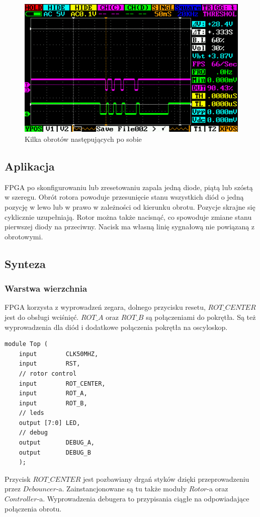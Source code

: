 \documentclass[a4paper,12pt]{article}
\begin{document}
\begin{figure}[htb]
   \centering
   \includegraphics[width=13cm]{grafika/dso/rotor-w-prawo-wiele.png}
   \caption{Kilka obrotów następujących po sobie}
\end{figure}

\subsection{Aplikacja}

FPGA po skonfigurowaniu lub zresetowaniu zapala jedną diode, piątą lub szóstą w szeregu. Obrót rotora powoduje przesunięcie stanu wszystkich diód o jedną pozycję w lewo lub w prawo w zależności od kierunku obrotu. Pozycje skrajne się cyklicznie uzupełniają. Rotor można także nacisnąć, co spowoduje zmiane stanu pierwszej diody na przeciwny. Nacisk ma własną linię sygnałową nie powiązaną z obrotowymi.

\subsection{Synteza}

\subsubsection{Warstwa wierzchnia}

FPGA korzysta z wyprowadzeń zegara, dolnego przycisku resetu, $ROT\_CENTER$ jest do obsługi wciśnięć. $ROT\_A$ oraz $ROT\_B$ są połączeniami do pokrętła. Są też wyprowadzenia dla diód i dodatkowe połączenia pokrętła na oscyloskop.
\begin{lstlisting}[label=Rs232Tx,caption=Rs232Tx.v,firstnumber=14]
module Top (
    input        CLK50MHZ,
    input        RST,
    // rotor control
    input        ROT_CENTER,
    input        ROT_A,
    input        ROT_B,
    // leds
    output [7:0] LED,
    // debug
    output       DEBUG_A,
    output       DEBUG_B
    );
\end{lstlisting}
Przycisk $ROT\_CENTER$ jest pozbawiany drgań styków dzięki przeprowadzeniu przez $Debouncer$-a. Zainstancjonowane są tu także moduły $Rotor$-a oraz $Controller$-a. Wyprowadzenia debugera to przypisania ciągłe na odpowiadające połączenia obrotu.
\end{document}
